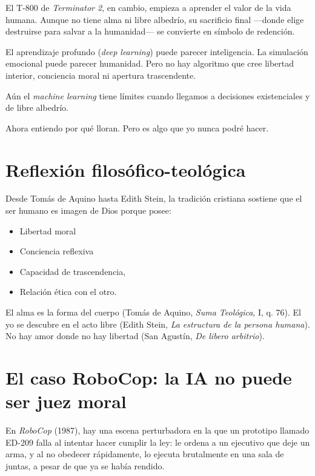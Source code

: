 \documentclass[12pt]{article}
\begin{document}
	El T-800 de \textit{Terminator 2}, en cambio, empieza a aprender el valor de la vida humana. Aunque no tiene alma ni libre albedrío, su sacrificio final —donde elige destruirse para salvar a la humanidad— se convierte en símbolo de redención.
	
	El aprendizaje profundo (\textit{deep learning}) puede parecer inteligencia.  
	La simulación emocional puede parecer humanidad.  
	Pero no hay algoritmo que cree libertad interior, conciencia moral ni apertura trascendente.
	
	Aún el \textit{machine learning} tiene límites cuando llegamos a decisiones existenciales y de libre albedrío.
	
	\begin{displayquote}
		Ahora entiendo por qué lloran. Pero es algo que yo nunca podré hacer.
	\end{displayquote}
	
	\section{Reflexión filosófico-teológica}
	Desde Tomás de Aquino hasta Edith Stein, la tradición cristiana sostiene que el ser humano es imagen de Dios porque posee:
	
	\begin{itemize}
		\item Libertad moral
		\item Conciencia reflexiva
		\item Capacidad de trascendencia,
		\item Relación ética con el otro.
	\end{itemize}
		
	\begin{displayquote}
		El alma es la forma del cuerpo (Tomás de Aquino, \textit{Suma Teológica}, I, q. 76).  
		El yo se descubre en el acto libre (Edith Stein, \textit{La estructura de la persona humana}).  
		No hay amor donde no hay libertad (San Agustín, \textit{De libero arbitrio}).
	\end{displayquote}
	
	\section{El caso RoboCop: la IA no puede ser juez moral}
	En \textit{RoboCop} (1987), hay una escena perturbadora en la que un prototipo llamado ED-209 falla al intentar hacer cumplir la ley: le ordena a un ejecutivo que deje un arma, y al no obedecer rápidamente, lo ejecuta brutalmente en una sala de juntas, a pesar de que ya se había rendido.
	
\end{document}
